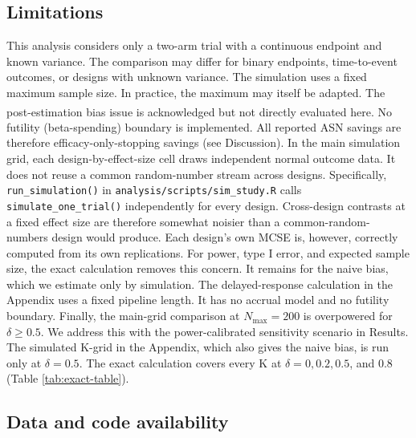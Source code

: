 \documentclass[
  11pt,
]{article}
\begin{document}
\subsection{Limitations}\label{limitations}

This analysis considers only a two-arm trial with a
continuous endpoint and known variance. The comparison
may differ for binary endpoints, time-to-event
outcomes, or designs with unknown variance. The
simulation uses a fixed maximum sample size. In
practice, the maximum may itself be adapted. The
post-estimation bias issue\textsuperscript{} is
acknowledged but not directly evaluated here. No
futility (beta-spending) boundary is implemented. All
reported ASN savings are therefore efficacy-only-stopping
savings (see Discussion). In the main simulation grid,
each design-by-effect-size cell draws independent
normal outcome data. It does not reuse a common
random-number stream across designs. Specifically,
\texttt{run\_simulation()} in \texttt{analysis/scripts/sim\_study.R}
calls \texttt{simulate\_one\_trial()} independently for every
design. Cross-design contrasts at a fixed effect size
are therefore somewhat noisier than a
common-random-numbers design would produce. Each
design's own MCSE is, however, correctly computed from
its own replications. For power, type I error, and
expected sample size, the exact calculation removes
this concern. It remains for the naive bias, which we
estimate only by simulation. The delayed-response
calculation in the Appendix uses a fixed pipeline
length. It has no accrual model and no futility
boundary. Finally, the main-grid comparison
at \(N_{\max} = 200\) is overpowered for
\(\delta \geq 0.5\). We address this with the
power-calibrated sensitivity scenario in Results.
The simulated K-grid in the Appendix, which also gives
the naive bias, is run only at \(\delta = 0.5\). The
exact calculation covers every K at
\(\delta = 0, 0.2, 0.5\), and \(0.8\) (Table
\ref{tab:exact-table}).

\subsection{Data and code availability}\label{data-and-code-availability}
\end{document}
